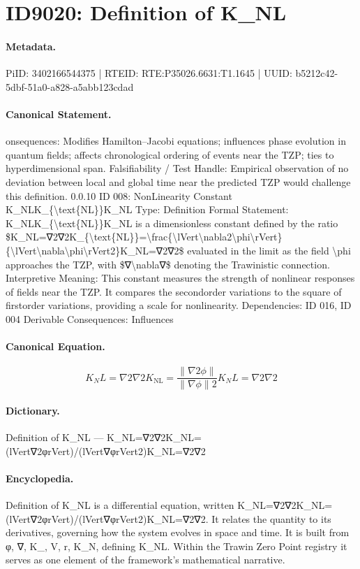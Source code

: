 \section*{ID9020: Definition of K\_NL}
\paragraph{Metadata.}
PiID: 3402166544375 | RTEID: RTE:P35026.6631:T1.1645 | UUID: b5212c42-5dbf-51a0-a828-a5abb123cdad

\paragraph{Canonical Statement.}
onsequences: Modifies Hamilton–Jacobi equations; influences phase evolution in quantum fields; affects chronological ordering of events near the TZP; ties to hyperdimensional span. Falsifiability / Test Handle: Empirical observation of no deviation between local and global time near the predicted TZP would challenge this definition. 0.0.10 ID 008: NonLinearity Constant K\_NLK\_\{\textbackslash{}text\{NL\}\}K\_NL Type: Definition Formal Statement: K\_NLK\_\{\textbackslash{}text\{NL\}\}K\_NL is a dimensionless constant defined by the ratio \$K\_NL=∇2∇2K\_\{\textbackslash{}text\{NL\}\}=\textbackslash{}frac\{\textbackslash{}lVert\textbackslash{}nabla2\textbackslash{}phi\textbackslash{}rVert\}\{\textbackslash{}lVert\textbackslash{}nabla\textbackslash{}phi\textbackslash{}rVert2\}K\_NL=∇2∇2\$ evaluated in the limit as the field \textbackslash{}phi approaches the TZP, with \$∇\textbackslash{}nabla∇\$ denoting the Trawinistic connection. Interpretive Meaning: This constant measures the strength of nonlinear responses of fields near the TZP. It compares the secondorder variations to the square of firstorder variations, providing a scale for nonlinearity. Dependencies: ID 016, ID 004 Derivable Consequences: Influences

\paragraph{Canonical Equation.}
\[
K_NL=∇2∇2K_{\text{NL}}=\frac{\lVert\nabla2\phi\rVert}{\lVert\nabla\phi\rVert2}K_NL=∇2∇2
\]

\paragraph{Dictionary.}
Definition of K\_NL — K\_NL=∇2∇2K\_NL=(lVert∇2φrVert)/(lVert∇φrVert2)K\_NL=∇2∇2

\paragraph{Encyclopedia.}
Definition of K\_NL is a differential equation, written K\_NL=∇2∇2K\_NL=(lVert∇2φrVert)/(lVert∇φrVert2)K\_NL=∇2∇2. It relates the quantity to its derivatives, governing how the system evolves in space and time. It is built from φ, ∇, K\_, V, r, K\_N, defining K\_NL. Within the Trawin Zero Point registry it serves as one element of the framework's mathematical narrative.
